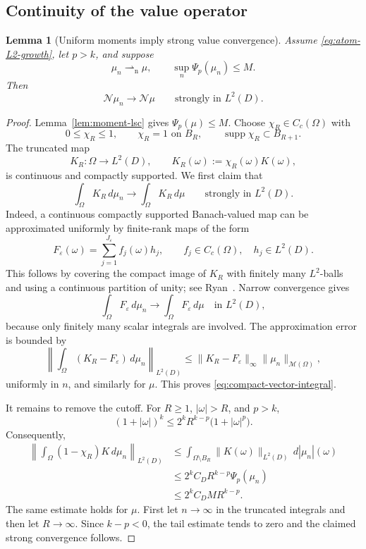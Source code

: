 \documentclass[11pt]{amsart}
\newtheorem{lemma}[theorem]{Lemma}
\theoremstyle{definition}
\theoremstyle{remark}
\DeclareMathOperator{\supp}{supp}
\newcommand{\M}{\mathcal{M}}
\newcommand{\N}{\mathcal{N}}
\newcommand{\weakn}{\rightharpoonup_{\mathrm n}}
\begin{document}
\subsection{Continuity of the value operator}

\begin{lemma}[Uniform moments imply strong value convergence]
\label{lem:value-continuity}
Assume \eqref{eq:atom-L2-growth}, let $p>k$, and suppose
\[
  \mu_n\weakn\mu,
  \qquad
  \sup_n\Psi_p(\mu_n)\leq M.
\]
Then
\[
  \N\mu_n\longrightarrow\N\mu
  \qquad\text{strongly in }L^2(D).
\]
\end{lemma}

\begin{proof}
Lemma~\ref{lem:moment-lsc} gives $\Psi_p(\mu)\leq M$.
Choose $\chi_R\in C_c(\Omega)$ with
\[
  0\leq\chi_R\leq1,\qquad
  \chi_R=1\text{ on }B_R,\qquad
  \supp\chi_R\subset B_{R+1}.
\]
The truncated map
\[
  K_R:\Omega\to L^2(D),\qquad
  K_R(\omega):=\chi_R(\omega)K(\omega),
\]
is continuous and compactly supported.  We first claim that
\begin{equation}
  \label{eq:compact-vector-integral}
  \int_\Omega K_R\,d\mu_n
  \longrightarrow
  \int_\Omega K_R\,d\mu
  \qquad\text{strongly in }L^2(D).
\end{equation}
Indeed, a continuous compactly supported Banach-valued map can be approximated
uniformly by finite-rank maps of the form
\[
  F_\varepsilon(\omega)
  =
  \sum_{j=1}^{J_\varepsilon}f_j(\omega)h_j,
  \qquad
  f_j\in C_c(\Omega),\quad h_j\in L^2(D).
\]
This follows by covering the compact image of $K_R$ with finitely many
$L^2$-balls and using a continuous partition of unity; see
Ryan~\cite[Section~3.2]{ryan-tensor}.  Narrow convergence
gives
\[
  \int_\Omega F_\varepsilon\,d\mu_n
  \longrightarrow
  \int_\Omega F_\varepsilon\,d\mu
  \quad\text{in }L^2(D),
\]
because only finitely many scalar integrals are involved.  The approximation
error is bounded by
\[
  \left\|
    \int_\Omega(K_R-F_\varepsilon)\,d\mu_n
  \right\|_{L^2(D)}
  \leq
  \|K_R-F_\varepsilon\|_\infty\|\mu_n\|_{\M(\Omega)},
\]
uniformly in $n$, and similarly for $\mu$.  This proves
\eqref{eq:compact-vector-integral}.

It remains to remove the cutoff.  For $R\geq1$, $|\omega|>R$, and $p>k$,
\[
  (1+|\omega|)^k
  \leq
  2^k R^{k-p}\bigl(1+|\omega|^p\bigr).
\]
Consequently,
\begin{align*}
  \left\|
    \int_\Omega(1-\chi_R)K\,d\mu_n
  \right\|_{L^2(D)}
  &\leq
  \int_{\Omega\setminus B_R}\|K(\omega)\|_{L^2(D)}\,d|\mu_n|(\omega)\\
  &\leq
  2^k C_D R^{k-p}\Psi_p(\mu_n)\\
  &\leq
  2^k C_D M R^{k-p}.
\end{align*}
The same estimate holds for $\mu$.  First let $n\to\infty$ in the truncated
integrals and then let $R\to\infty$.  Since $k-p<0$, the tail estimate tends
to zero and the claimed strong convergence follows.
\end{proof}
\end{document}
